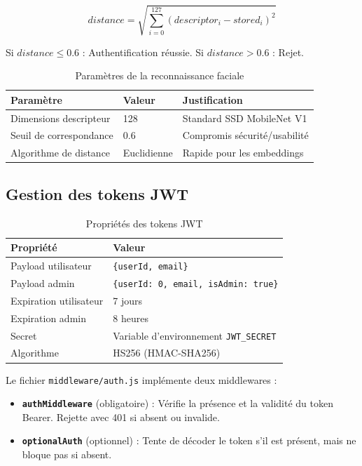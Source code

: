 \begin{equation}
distance = \sqrt{\sum_{i=0}^{127}(descriptor_i - stored_i)^2}
\end{equation}

Si $distance \leq 0.6$ : Authentification réussie. Si $distance > 0.6$ : Rejet.

\begin{table}[H]
\centering
\caption{Paramètres de la reconnaissance faciale}
\label{tab:face-params}
\begin{tabular}{|l|l|l|}
\hline
\textbf{Paramètre} & \textbf{Valeur} & \textbf{Justification} \\
\hline
Dimensions descripteur & 128 & Standard SSD MobileNet V1 \\
\hline
Seuil de correspondance & 0.6 & Compromis sécurité/usabilité \\
\hline
Algorithme de distance & Euclidienne & Rapide pour les embeddings \\
\hline
\end{tabular}
\end{table}

\subsection{Gestion des tokens JWT}

\begin{table}[H]
\centering
\caption{Propriétés des tokens JWT}
\label{tab:jwt-props}
\begin{tabular}{|l|l|}
\hline
\textbf{Propriété} & \textbf{Valeur} \\
\hline
Payload utilisateur & \texttt{\{userId, email\}} \\
\hline
Payload admin & \texttt{\{userId: 0, email, isAdmin: true\}} \\
\hline
Expiration utilisateur & 7 jours \\
\hline
Expiration admin & 8 heures \\
\hline
Secret & Variable d'environnement \texttt{JWT\_SECRET} \\
\hline
Algorithme & HS256 (HMAC-SHA256) \\
\hline
\end{tabular}
\end{table}

Le fichier \texttt{middleware/auth.js} implémente deux middlewares :
\begin{itemize}
    \item \textbf{\texttt{authMiddleware}} (obligatoire) : Vérifie la présence et la validité du token Bearer. Rejette avec 401 si absent ou invalide.
    \item \textbf{\texttt{optionalAuth}} (optionnel) : Tente de décoder le token s'il est présent, mais ne bloque pas si absent.
\end{itemize}

